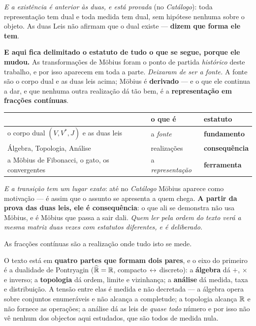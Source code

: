 \documentclass[livro.tex]{subfiles}
\begin{document}
\noindent \emph{E a existência é anterior às duas, e está provada} (no \emph{Catálogo}): toda
representação tem dual e toda medida tem dual, sem hipótese nenhuma sobre o objeto. As duas Leis não
afirmam que o dual existe --- \textbf{dizem que forma ele tem}.


\medskip
\noindent \textbf{E aqui fica delimitado o estatuto de tudo o que se segue, porque ele mudou.} As
transformações de Möbius foram o ponto de partida \emph{histórico} deste trabalho, e por isso
aparecem em toda a parte. \emph{Deixaram de ser a fonte.} A fonte são o corpo dual e as duas leis
acima; Möbius é \textbf{derivado} --- e o que ele continua a dar, e que nenhuma outra realização dá
tão bem, é a \textbf{representação em fracções contínuas}.

\begin{center}\small
\begin{tabular}{@{}lll@{}}
\toprule
 & \textbf{o que é} & \textbf{estatuto} \\
\midrule
o corpo dual $(V,V^{*},J)$ e as duas leis & a \emph{fonte} & \textbf{fundamento} \\
Álgebra, Topologia, Análise & realizações & \textbf{consequência} \\
a Möbius de Fibonacci, o gato, os convergentes & a \emph{representação} & \textbf{ferramenta} \\
\bottomrule
\end{tabular}
\end{center}

\noindent \emph{E a transição tem um lugar exato}: até no \emph{Catálogo} Möbius aparece como
motivação --- é assim que o assunto se apresenta a quem chega. \textbf{A partir da prova das duas
leis, ele é consequência}: o que ali se demonstra não usa Möbius, e é Möbius que passa a sair dali.
\emph{Quem ler pela ordem do texto verá a mesma matriz duas vezes com estatutos diferentes, e é
deliberado.}

\medskip
\noindent As fracções contínuas são a realização onde tudo isto se mede.

\medskip
\noindent O texto está em \textbf{quatro partes que formam dois pares}, e o eixo do primeiro é a dualidade de
Pontryagin ($\widehat{\mathbb R}=\mathbb R$, compacto\,$\leftrightarrow$\,discreto): a \textbf{álgebra} dá $+$,
$\times$ e inverso; a \textbf{topologia} dá ordem, limite e vizinhança; a \textbf{análise} dá
medida, taxa e distribuição. A tensão entre elas é medida e não decretada --- a álgebra opera sobre
conjuntos enumeráveis e não alcança a completude; a topologia alcança $\mathbb R$ e não fornece as
operações; a análise dá as leis de \emph{quase todo} número e por isso não vê nenhum dos objectos
aqui estudados, que são todos de medida nula.
\end{document}
